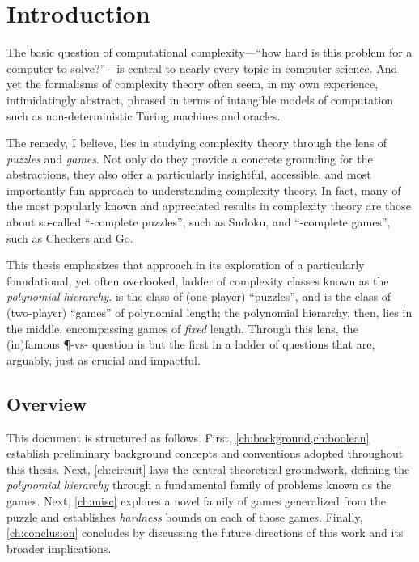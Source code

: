 \chapter{Introduction}

The basic question of computational complexity---``how hard is this problem for
a computer to solve?''---is central to nearly every topic in computer science.
And yet the formalisms of complexity theory often seem, in my own experience,
intimidatingly abstract, phrased in terms of intangible models of computation
such as non-deterministic Turing machines and oracles.

The remedy, I believe, lies in studying complexity theory through the lens of
\emph{puzzles} and \emph{games}.  Not only do they provide a concrete grounding
for the abstractions, they also offer a particularly insightful, accessible,
and most importantly fun approach to understanding complexity theory.  In fact,
many of the most popularly known and appreciated results in complexity theory
are those about so-called ``\NP-complete puzzles'', such as Sudoku, and
``\PSPACE-complete games'', such as Checkers and Go.

This thesis emphasizes that approach in its exploration of a particularly
foundational, yet often overlooked, ladder of complexity classes known as the
\emph{polynomial hierarchy}.  \NP{} is the class of (one-player) ``puzzles'',
and \PSPACE{} is the class of (two-player) ``games'' of polynomial length; the
polynomial hierarchy, then, lies in the middle, encompassing games of
\emph{fixed} length.  Through this lens, the (in)famous \P-vs-\NP{} question is
but the first in a ladder of questions that are, arguably, just as crucial and
impactful.


\section{Overview}

This document is structured as follows.  First, \cref{ch:background,ch:boolean}
establish preliminary background concepts and conventions adopted throughout
this thesis.  Next, \cref{ch:circuit} lays the central theoretical groundwork,
defining the \emph{polynomial hierarchy} through a fundamental family of
problems known as the  games.  Next,
\cref{ch:misc} explores a novel family of games generalized from the
 puzzle and establishes \emph{hardness} bounds on
each of those games.  Finally, \cref{ch:conclusion} concludes by discussing the
future directions of this work and its broader implications.

